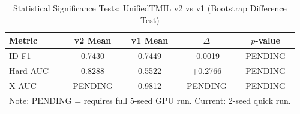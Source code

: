 \begin{table}[t]
\centering
\caption{Statistical Significance Tests: UnifiedTMIL v2 vs v1 (Bootstrap Difference Test)}
\label{tab:stat_tests}
\begin{tabular}{lcccc}
\hline
Metric & v2 Mean & v1 Mean & $\Delta$ & $p$-value \\
\hline
ID-F1 & 0.7430 & 0.7449 & -0.0019 & PENDING \\
Hard-AUC & 0.8288 & 0.5522 & +0.2766 & PENDING \\
X-AUC & PENDING & 0.9812 & PENDING & PENDING \\
\hline
\multicolumn{5}{l}{\small Note: PENDING = requires full 5-seed GPU run. Current: 2-seed quick run.} \\
\end{tabular}
\end{table}
